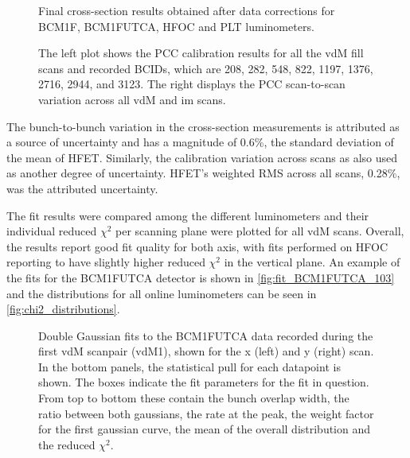 \begin{figure}[!htb]
	\centering
	\caption{Final cross-section results obtained after data corrections for BCM1F, BCM1FUTCA, HFOC and PLT luminometers.}
	\label{fig:all_Corr_luminometer_xsec}
\end{figure}

\begin{figure}[!htb]
	\centering
	\caption{The left plot shows the PCC calibration results for all the vdM fill scans and recorded BCIDs, which are 208, 282, 548, 822, 1197, 1376, 2716, 2944, and 3123. The right displays the PCC scan-to-scan variation across all vdM and im scans.
	}
	\label{fig:cross_section_results_pcc}
\end{figure}

The bunch-to-bunch variation in the cross-section measurements is attributed as a source of uncertainty and has a magnitude of 0.6\%, the standard deviation of the mean of HFET. Similarly, the calibration variation across scans as also used as another degree of uncertainty. HFET's weighted RMS across all scans, 0.28\%, was the attributed uncertainty.

The fit results were compared among the different luminometers and their individual reduced $\chi^2$ per scanning plane were plotted for all vdM scans. Overall, the results report good fit quality for both axis, with fits performed on HFOC reporting to have slightly higher reduced $\chi^2$ in the vertical plane. An example of the fits for the BCM1FUTCA detector is shown in \autoref{fig:fit_BCM1FUTCA_103} and the distributions for all online luminometers can be seen in \autoref{fig:chi2_distributions}.

\begin{figure}[!htb]
	\centering
	\caption{Double Gaussian fits to the BCM1FUTCA data recorded during the first vdM scanpair (vdM1), shown for the x (left) and y (right) scan. In the bottom panels, the statistical pull for each datapoint is shown. The boxes indicate the fit parameters for the fit in question. From top to bottom these contain the bunch overlap width, the ratio between both gaussians, the rate at the peak, the weight factor for the first gaussian curve, the mean of the overall distribution and the reduced $\chi^2$.}
	\label{fig:fit_BCM1FUTCA_103}
\end{figure}

